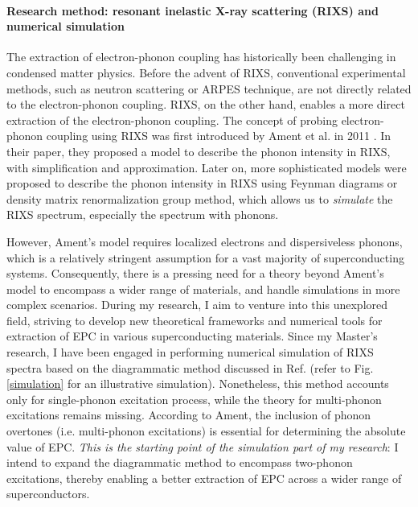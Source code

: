 \documentclass[11pt]{article}
\begin{document}
\paragraph{Research method: resonant inelastic X-ray scattering (RIXS) and numerical simulation}
The extraction of electron-phonon coupling has historically been challenging in condensed matter physics. 
Before the advent of RIXS, conventional experimental methods, such as neutron scattering or ARPES technique, are not directly related to the electron-phonon coupling. 
RIXS, on the other hand, enables a more direct extraction of the electron-phonon coupling. 
The concept of probing electron-phonon coupling using RIXS was first introduced by Ament et al. in 2011 \cite{ament_resonant_2011}. 
In their paper, they proposed a model to describe the phonon intensity in RIXS, with simplification and approximation. 
Later on, more sophisticated models were proposed to describe the phonon intensity in RIXS using Feynman diagrams \cite{devereaux_directly_2016,matsubayashi_numerical_2023,bieniasz_theory_2022,geondzhian_generalization_2020} or density matrix renormalization group method\cite{nocera_computing_2018}, which allows us to \textit{simulate} the RIXS spectrum, especially the spectrum with phonons. 

However, Ament's model requires localized electrons and dispersiveless phonons, which is a relatively stringent assumption for a vast majority of superconducting systems. 
Consequently, there is a pressing need for a theory beyond Ament's model to encompass a wider range of materials, and handle simulations in more complex scenarios. 
{During my research, I aim to venture into this unexplored field, striving to develop new theoretical frameworks and numerical tools for extraction of EPC in various superconducting materials.} 
Since my Master's research, I have been engaged in performing numerical simulation of RIXS spectra based on the diagrammatic method discussed in Ref.\cite{devereaux_directly_2016} (refer to Fig.\ref{simulation} for an illustrative simulation). 
Nonetheless, this method accounts only for single-phonon excitation process, while the theory for multi-phonon excitations remains missing.
According to Ament\cite{ament_determining_2011}, the inclusion of phonon overtones (i.e. multi-phonon excitations) is essential for determining the absolute value of EPC. \textit{This is the starting point of the simulation part of my research}: I intend to expand the diagrammatic method to encompass two-phonon excitations, thereby enabling a better extraction of EPC across a wider range of superconductors. 
\end{document}
